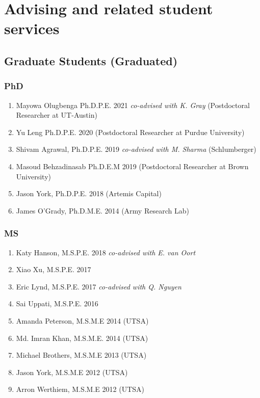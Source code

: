 \section*{Advising and related student services}

\subsection*{Graduate Students (Graduated)}

\subsubsection*{PhD}
\begin{enumerate}
    \item Mayowa Olugbenga Ph.D.P.E. 2021 \emph{co-advised with K. Gray} (Postdoctoral Researcher at UT-Austin)
    \item Yu Leng Ph.D.P.E. 2020 (Postdoctoral Researcher at Purdue University)
    \item Shivam Agrawal, Ph.D.P.E. 2019 \emph{co-advised with M. Sharma} (Schlumberger)
    \item Masoud Behzadinasab Ph.D.E.M 2019 (Postdoctoral Researcher at Brown University)
    \item Jason York, Ph.D.P.E. 2018 (Artemis Capital) 
    \item James O'Grady, Ph.D.M.E. 2014 (Army Research Lab)
\end{enumerate}

\subsubsection*{MS}
\begin{enumerate}
    \item Katy Hanson, M.S.P.E. 2018 \emph{co-advised with E. van Oort}
    \item Xiao Xu, M.S.P.E. 2017
    \item Eric Lynd, M.S.P.E. 2017  \emph{co-advised with Q. Nguyen}
    \item Sai Uppati, M.S.P.E. 2016
    \item Amanda Peterson, M.S.M.E 2014 (UTSA)
    \item Md. Imran Khan, M.S.M.E. 2014 (UTSA)
    \item Michael Brothers, M.S.M.E 2013 (UTSA)
    \item Jason York, M.S.M.E 2012 (UTSA)
    \item Arron Werthiem, M.S.M.E 2012 (UTSA)
\end{enumerate}

